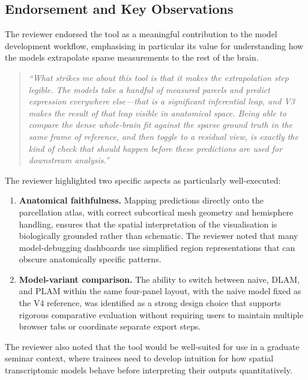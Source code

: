 \documentclass[11pt,letterpaper]{article}
\begin{document}
\subsection*{Endorsement and Key Observations}

The reviewer endorsed the tool as a meaningful contribution to the model
development workflow, emphasising in particular its value for understanding
how the models extrapolate sparse measurements to the rest of the brain.

\begin{quote}
\itshape
``What strikes me about this tool is that it makes the extrapolation step
legible. The models take a handful of measured parcels and predict expression
everywhere else---that is a significant inferential leap, and V3 makes the
result of that leap visible in anatomical space. Being able to compare the
dense whole-brain fit against the sparse ground truth in the same frame of
reference, and then toggle to a residual view, is exactly the kind of check
that should happen before these predictions are used for downstream analysis.''
\end{quote}

The reviewer highlighted two specific aspects as particularly well-executed:

\begin{enumerate}[nosep]
  \item \textbf{Anatomical faithfulness.}
        Mapping predictions directly onto the parcellation atlas, with correct
        subcortical mesh geometry and hemisphere handling, ensures that the
        spatial interpretation of the visualisation is biologically grounded
        rather than schematic.
        The reviewer noted that many model-debugging dashboards use simplified
        region representations that can obscure anatomically specific patterns.

  \item \textbf{Model-variant comparison.}
        The ability to switch between naive, DLAM, and PLAM within the same
        four-panel layout, with the naive model fixed as the V4 reference,
        was identified as a strong design choice that supports rigorous
        comparative evaluation without requiring users to maintain multiple
        browser tabs or coordinate separate export steps.
\end{enumerate}

The reviewer also noted that the tool would be well-suited for use in a
graduate seminar context, where trainees need to develop intuition for how
spatial transcriptomic models behave before interpreting their outputs
quantitatively.
\end{document}
